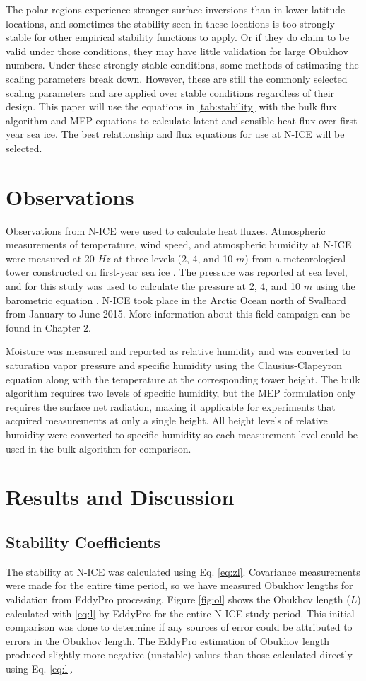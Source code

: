 The polar regions experience stronger surface inversions than in lower-latitude locations, and sometimes the stability seen in these locations is too strongly stable for other empirical stability functions to apply. Or if they do claim to be valid under those conditions, they may have little validation for large Obukhov numbers. Under these strongly stable conditions, some methods of estimating the scaling parameters break down. However, these are still the commonly selected scaling parameters and are applied over stable conditions regardless of their design. This paper will use the equations in \ref{tab:stability} with the bulk flux algorithm and MEP equations to calculate latent and sensible heat flux over first-year sea ice. The best relationship and flux equations for use at N-ICE will be selected. 

\section{Observations}
Observations from N-ICE were used to calculate heat fluxes. Atmospheric measurements of temperature, wind speed, and atmospheric humidity at N-ICE were measured at 20 $Hz$ at three levels (2, 4, and 10 $m$) from a meteorological tower constructed on first-year sea ice \citep{walden:2017}. The pressure was reported at sea level, and for this study was used to calculate the pressure at 2, 4, and 10 $m$ using the barometric equation \citep{lente:2020}. N-ICE took place in the Arctic Ocean north of Svalbard from January to June 2015. More information about this field campaign can be found in Chapter 2.
 
 Moisture was measured and reported as relative humidity and was converted to saturation vapor pressure and specific humidity using the Clausius-Clapeyron equation \citep{iribarne:1981} along with the temperature at the corresponding tower height. The bulk algorithm requires two levels of specific humidity, but the MEP formulation only requires the surface net radiation, making it applicable for experiments that acquired measurements at only a single height. All height levels of relative humidity were converted to specific humidity so each measurement level could be used in the bulk algorithm for comparison. 

\section{Results and Discussion}
\subsection{Stability Coefficients}
The stability at N-ICE was calculated using Eq. \ref{eq:zl}. Covariance measurements were made for the entire time period, so we have measured Obukhov lengths for validation from EddyPro processing. Figure \ref{fig:ol} shows the Obukhov length ($L$) calculated with \ref{eq:l} by EddyPro for the entire N-ICE study period. This initial comparison was done to determine if any sources of error could be attributed to errors in the Obukhov length. The EddyPro estimation of Obukhov length produced slightly more negative (unstable) values than those calculated directly using Eq. \ref{eq:l}. 

